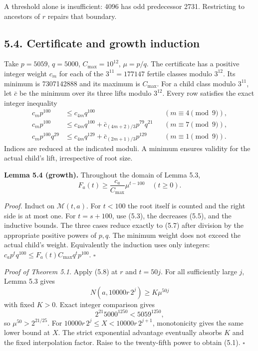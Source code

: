 \documentclass[11pt,a4paper]{article}
\begin{document}
A threshold alone is insufficient: 4096 has odd predecessor 2731.
Restricting to ancestors of \(r\) repairs that boundary.

\subsection{5.4. Certificate and growth
induction}\label{certificate-and-growth-induction}

Take \(p=5059\), \(q=5000\), \(C_{\max}=10^{12}\), \(\mu=p/q\). The
certificate has a positive integer weight \(c_m\) for each of the
\(3^{11}=177147\) fertile classes modulo \(3^{12}\). Its minimum is
7307142888 and its maximum is \(C_{\max}\). For a child class modulo
\(3^{11}\), let \(\bar c\) be the minimum over its three lifts modulo
\(3^{12}\). Every row satisfies the exact integer inequality \[
\begin{aligned}
c_m p^{100}&\le c_{4m}q^{100}
&& (m\equiv4\pmod9),\\
c_m p^{100}&\le c_{4m}q^{100}
 +\bar c_{(4m+2)/3}p^{79}q^{21}
&& (m\equiv7\pmod9),\\
c_m p^{100}q^{29}&\le c_{4m}q^{129}
 +\bar c_{(2m+1)/3}p^{129}
&& (m\equiv1\pmod9).
\end{aligned}
\tag{5.7}
\] Indices are reduced at the indicated moduli. A minimum ensures
validity for the actual child's lift, irrespective of root size.

\textbf{Lemma 5.4 (growth).} Throughout the domain of Lemma 5.3, \[
F_a(t)\ge\frac{c_a}{C_{\max}}\mu^{t-100}\quad(t\ge0).
\tag{5.8}
\]

\emph{Proof.} Induct on \(\mathcal M(t,a)\). For \(t<100\) the root
itself is counted and the right side is at most one. For \(t=s+100\),
use (5.3), the decreases (5.5), and the inductive bounds. The three
cases reduce exactly to (5.7) after division by the appropriate positive
powers of \(p,q\). The minimum weight does not exceed the actual child's
weight. Equivalently the induction uses only integers:
\(c_ap^tq^{100}\le F_a(t)C_{\max}q^tp^{100}\). \(\square\)

\emph{Proof of Theorem 5.1.} Apply (5.8) at \(r\) and \(t=50j\). For all
sufficiently large \(j\), Lemma 5.3 gives \[
N(a,10000r\,2^j)\ge K\mu^{50j}
\] with fixed \(K>0\). Exact integer comparison gives \[
2^{21}5000^{1250}<5059^{1250},
\tag{5.9}
\] so \(\mu^{50}>2^{21/25}\). For \(10000r\,2^j\le X<10000r\,2^{j+1}\),
monotonicity gives the same lower bound at \(X\). The strict exponential
advantage eventually absorbs \(K\) and the fixed interpolation factor.
Raise to the twenty-fifth power to obtain (5.1). \(\square\)
\end{document}
